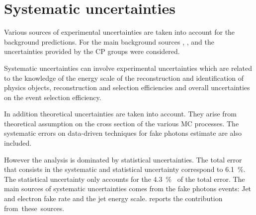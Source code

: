   

\section{Systematic uncertainties}
Various sources of experimental uncertainties are taken into account for the background predictions. For the main background sources \znng, \zg, \wg and \gj the uncertainties provided by the CP groups were considered.

Systematic uncertainties can involve experimental uncertainties which are related to the knowledge of the energy scale of the reconstruction and identification of physics objects, reconstruction and selection efficiencies and overall uncertainties on the event selection efficiency. \par In addition theoretical uncertainties are taken into account. They arise from theoretical assumption on the cross section of the various MC processes. The systematic errors on data-driven techniques for fake photons estimate are also included.


However the \mph analysis is dominated by statistical uncertainties. The total error that consists in the systematic and statistical uncertainty correspond to \SI{6.1}{\percent}. The statistical uncertainty only accounts for the \SI{4.3}{\percent}~\cite{paperMP} of the total error. The main sources of systematic uncertainties comes from the fake photons events: Jet and electron fake rate and the jet energy scale. \Tab{\ref{table:sys}} reports the contribution \mbox{from these sources}.

